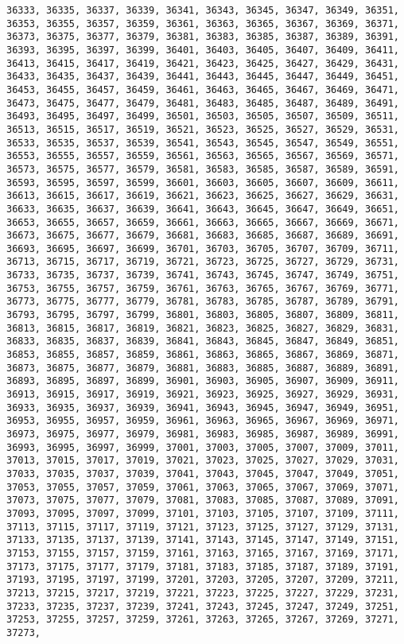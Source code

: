 \documentclass[11pt]{article}
\begin{document}
\begin{Verbatim}[commandchars=\\\{\}]
36333, 36335, 36337, 36339, 36341, 36343, 36345, 36347, 36349, 36351, 36353, 36355, 36357, 36359, 36361, 36363, 36365, 36367, 36369, 36371, 36373, 36375, 36377, 36379, 36381, 36383, 36385, 36387, 36389, 36391, 36393, 36395, 36397, 36399, 36401, 36403, 36405, 36407, 36409, 36411, 36413, 36415, 36417, 36419, 36421, 36423, 36425, 36427, 36429, 36431, 36433, 36435, 36437, 36439, 36441, 36443, 36445, 36447, 36449, 36451, 36453, 36455, 36457, 36459, 36461, 36463, 36465, 36467, 36469, 36471, 36473, 36475, 36477, 36479, 36481, 36483, 36485, 36487, 36489, 36491, 36493, 36495, 36497, 36499, 36501, 36503, 36505, 36507, 36509, 36511, 36513, 36515, 36517, 36519, 36521, 36523, 36525, 36527, 36529, 36531, 36533, 36535, 36537, 36539, 36541, 36543, 36545, 36547, 36549, 36551, 36553, 36555, 36557, 36559, 36561, 36563, 36565, 36567, 36569, 36571, 36573, 36575, 36577, 36579, 36581, 36583, 36585, 36587, 36589, 36591, 36593, 36595, 36597, 36599, 36601, 36603, 36605, 36607, 36609, 36611, 36613, 36615, 36617, 36619, 36621, 36623, 36625, 36627, 36629, 36631, 36633, 36635, 36637, 36639, 36641, 36643, 36645, 36647, 36649, 36651, 36653, 36655, 36657, 36659, 36661, 36663, 36665, 36667, 36669, 36671, 36673, 36675, 36677, 36679, 36681, 36683, 36685, 36687, 36689, 36691, 36693, 36695, 36697, 36699, 36701, 36703, 36705, 36707, 36709, 36711, 36713, 36715, 36717, 36719, 36721, 36723, 36725, 36727, 36729, 36731, 36733, 36735, 36737, 36739, 36741, 36743, 36745, 36747, 36749, 36751, 36753, 36755, 36757, 36759, 36761, 36763, 36765, 36767, 36769, 36771, 36773, 36775, 36777, 36779, 36781, 36783, 36785, 36787, 36789, 36791, 36793, 36795, 36797, 36799, 36801, 36803, 36805, 36807, 36809, 36811, 36813, 36815, 36817, 36819, 36821, 36823, 36825, 36827, 36829, 36831, 36833, 36835, 36837, 36839, 36841, 36843, 36845, 36847, 36849, 36851, 36853, 36855, 36857, 36859, 36861, 36863, 36865, 36867, 36869, 36871, 36873, 36875, 36877, 36879, 36881, 36883, 36885, 36887, 36889, 36891, 36893, 36895, 36897, 36899, 36901, 36903, 36905, 36907, 36909, 36911, 36913, 36915, 36917, 36919, 36921, 36923, 36925, 36927, 36929, 36931, 36933, 36935, 36937, 36939, 36941, 36943, 36945, 36947, 36949, 36951, 36953, 36955, 36957, 36959, 36961, 36963, 36965, 36967, 36969, 36971, 36973, 36975, 36977, 36979, 36981, 36983, 36985, 36987, 36989, 36991, 36993, 36995, 36997, 36999, 37001, 37003, 37005, 37007, 37009, 37011, 37013, 37015, 37017, 37019, 37021, 37023, 37025, 37027, 37029, 37031, 37033, 37035, 37037, 37039, 37041, 37043, 37045, 37047, 37049, 37051, 37053, 37055, 37057, 37059, 37061, 37063, 37065, 37067, 37069, 37071, 37073, 37075, 37077, 37079, 37081, 37083, 37085, 37087, 37089, 37091, 37093, 37095, 37097, 37099, 37101, 37103, 37105, 37107, 37109, 37111, 37113, 37115, 37117, 37119, 37121, 37123, 37125, 37127, 37129, 37131, 37133, 37135, 37137, 37139, 37141, 37143, 37145, 37147, 37149, 37151, 37153, 37155, 37157, 37159, 37161, 37163, 37165, 37167, 37169, 37171, 37173, 37175, 37177, 37179, 37181, 37183, 37185, 37187, 37189, 37191, 37193, 37195, 37197, 37199, 37201, 37203, 37205, 37207, 37209, 37211, 37213, 37215, 37217, 37219, 37221, 37223, 37225, 37227, 37229, 37231, 37233, 37235, 37237, 37239, 37241, 37243, 37245, 37247, 37249, 37251, 37253, 37255, 37257, 37259, 37261, 37263, 37265, 37267, 37269, 37271, 37273, 
\end{Verbatim}
\end{document}
